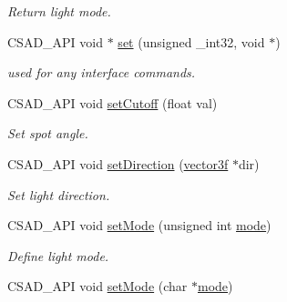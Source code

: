 \begin{DoxyCompactItemize}
\begin{DoxyCompactList}\small\item\em Return light mode. \end{DoxyCompactList}\item 
\hypertarget{classcsad_1_1_light_a907bb4b27c9793e11ed5900bc6494680}{C\-S\-A\-D\-\_\-\-A\-P\-I void $\ast$ \hyperlink{classcsad_1_1_light_a907bb4b27c9793e11ed5900bc6494680}{set} (unsigned \-\_\-int32, void $\ast$)}\label{classcsad_1_1_light_a907bb4b27c9793e11ed5900bc6494680}

\begin{DoxyCompactList}\small\item\em used for any interface commands. \end{DoxyCompactList}\item 
\hypertarget{classcsad_1_1_light_a2122141dc16723e2cb41f304e07fd825}{C\-S\-A\-D\-\_\-\-A\-P\-I void \hyperlink{classcsad_1_1_light_a2122141dc16723e2cb41f304e07fd825}{set\-Cutoff} (float val)}\label{classcsad_1_1_light_a2122141dc16723e2cb41f304e07fd825}

\begin{DoxyCompactList}\small\item\em Set spot angle. \end{DoxyCompactList}\item 
\hypertarget{classcsad_1_1_light_a84be595e475849367973298993ba5a1b}{C\-S\-A\-D\-\_\-\-A\-P\-I void \hyperlink{classcsad_1_1_light_a84be595e475849367973298993ba5a1b}{set\-Direction} (\hyperlink{classbt_1_1vector3f}{vector3f} $\ast$dir)}\label{classcsad_1_1_light_a84be595e475849367973298993ba5a1b}

\begin{DoxyCompactList}\small\item\em Set light direction. \end{DoxyCompactList}\item 
\hypertarget{classcsad_1_1_light_ac499ecad2c29f85e08f5b0b14de9014c}{C\-S\-A\-D\-\_\-\-A\-P\-I void \hyperlink{classcsad_1_1_light_ac499ecad2c29f85e08f5b0b14de9014c}{set\-Mode} (unsigned int \hyperlink{classcsad_1_1_light_a4fc5e4e222d852a082cb32dddcab3c8b}{mode})}\label{classcsad_1_1_light_ac499ecad2c29f85e08f5b0b14de9014c}

\begin{DoxyCompactList}\small\item\em Define light mode. \end{DoxyCompactList}\item 
\hypertarget{classcsad_1_1_light_a6f2415fd8966df1ec467ba7595cec08e}{C\-S\-A\-D\-\_\-\-A\-P\-I void \hyperlink{classcsad_1_1_light_a6f2415fd8966df1ec467ba7595cec08e}{set\-Mode} (char $\ast$\hyperlink{classcsad_1_1_light_a4fc5e4e222d852a082cb32dddcab3c8b}{mode})}\label{classcsad_1_1_light_a6f2415fd8966df1ec467ba7595cec08e}


\end{DoxyCompactItemize}
